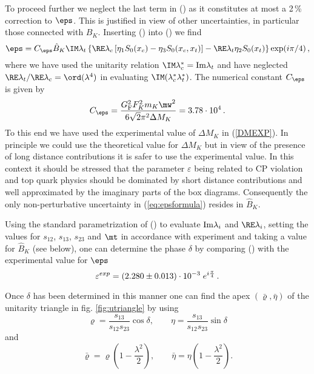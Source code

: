 To proceed further we neglect the last term in () as it
 constitutes at most a 2\,\% correction to $\eps$. This is justified
in view of other uncertainties, in particular those connected with
$B_K$.
Inserting () into () we find
\begin{equation}
\eps=C_{\eps} \hat B_K \IM\lambda_t \left\{
\RE\lambda_c \left[ \eta_1 S_0(x_c) - \eta_3 S_0(x_c, x_t) \right] -
\RE\lambda_t \eta_2 S_0(x_t) \right\} \exp(i \pi/4)\,,
\label{eq:epsformula}
\end{equation}
where we have used the unitarity relation $\IM\lambda_c^* = {\rm
Im}\lambda_t$ and  have neglected $\RE\lambda_t/\RE\lambda_c
 = \ord(\lambda^4)$ in evaluating $\IM(\lambda_c^* \lambda_t^*)$.
The numerical constant $C_\eps$ is given by
\begin{equation}
C_\eps = \frac{G_{\rm F}^2 F_K^2 m_K \mw^2}{6 \sqrt{2} \pi^2 \Delta M_K}
       = 3.78 \cdot 10^4 \, .
\label{eq:Ceps}
\end{equation}
To this end we have used the experimental value of $\Delta M_K$ 
in (\ref{DMEXP}). In principle we could use the theoretical
value for $\Delta M_K$ but in view of the presence of long
distance contributions it is safer to use the experimental
value. In this context it should be stressed that 
the parameter $\varepsilon$ 
being related to CP violation and top quark physics should
be dominated by short distance contributions and well approximated
by the imaginary parts of the box diagrams.
Consequently the only non-perturbative uncertainty in 
(\ref{eq:epsformula}) resides in $\hat B_K$.

Using the standard parametrization of () to evaluate ${\rm
Im}\lambda_i$ and $\RE\lambda_i$, setting the values for $s_{12}$,
$s_{13}$, $s_{23}$ and $\mt$ in accordance with experiment
 and taking a value for $\hat B_K$ (see below), one can
determine the phase $\delta$ by comparing () with the
experimental value for $\eps$
\begin{equation}\label{eexp}
\varepsilon^{exp}
=(2.280\pm0.013)\cdot10^{-3}\;e^{i{\pi\over 4}}\,.
\end{equation}

Once $\delta$ has been determined in this manner one can find the
apex $(\bar\varrho,\bar\eta)$ of the unitarity triangle
in fig. \ref{fig:utriangle}   by using 
\begin{equation}\label{2.84a} 
\varrho=\frac{s_{13}}{s_{12}s_{23}}\cos\delta,
\qquad
\eta=\frac{s_{13}}{s_{12}s_{23}}\sin\delta
\end{equation}
and
\begin{equation}\label{2.88da}
\bar\varrho=\varrho (1-\frac{\lambda^2}{2}),
\qquad
\bar\eta=\eta (1-\frac{\lambda^2}{2}).
\end{equation}

